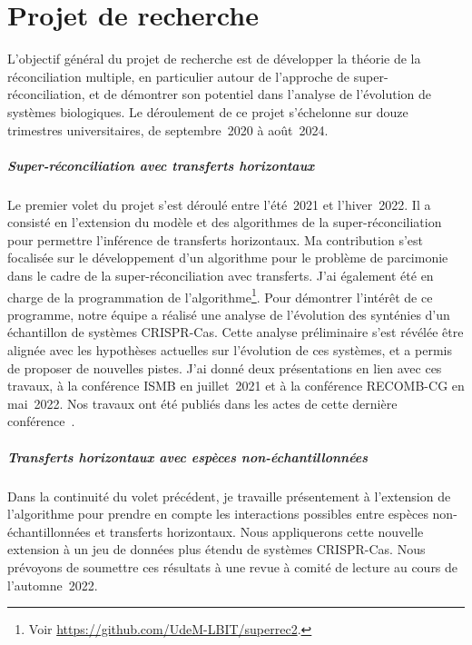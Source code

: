 \chapter{Projet de recherche}

L’objectif général du projet de recherche est de développer la théorie de la réconciliation multiple, en particulier autour de l’approche de super-réconciliation, et de démontrer son potentiel dans l’analyse de l’évolution de systèmes biologiques.
Le déroulement de ce projet s’échelonne sur douze trimestres universitaires, de septembre~2020 à août~2024.

\paragraph{Super-réconciliation avec transferts horizontaux}
Le premier volet du projet s’est déroulé entre l’été~2021 et l’hiver~2022.
Il a consisté en l’extension du modèle et des algorithmes de la super-réconciliation pour permettre l’inférence de transferts horizontaux.
Ma contribution s’est focalisée sur le développement d’un algorithme pour le problème de parcimonie dans le cadre de la super-réconciliation avec transferts.
J’ai également été en charge de la programmation de l’algorithme\footnote{Voir \url{https://github.com/UdeM-LBIT/superrec2}.}.
Pour démontrer l’intérêt de ce programme, notre équipe a réalisé une analyse de l’évolution des synténies d’un échantillon de systèmes CRISPR-Cas.
Cette analyse préliminaire s’est révélée être alignée avec les hypothèses actuelles sur l’évolution de ces systèmes, et a permis de proposer de nouvelles pistes.
J’ai donné deux présentations en lien avec ces travaux, à la conférence ISMB en juillet~2021 et à la conférence RECOMB-CG en mai~2022.
Nos travaux ont été publiés dans les actes de cette dernière conférence~\parencite{Anselmetti2022ReconciliationSegmentalDuplication}.

\paragraph{Transferts horizontaux avec espèces non-échantillonnées}
Dans la continuité du volet précédent, je travaille présentement à l’extension de l’algorithme pour prendre en compte les interactions possibles entre espèces non-échantillonnées et transferts horizontaux.
Nous appliquerons cette nouvelle extension à un jeu de données plus étendu de systèmes CRISPR-Cas.
Nous prévoyons de soumettre ces résultats à une revue à comité de lecture au cours de l’automne~2022.

